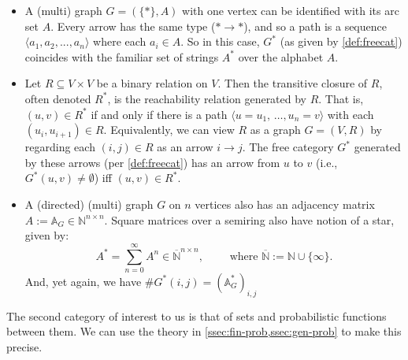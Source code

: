\begin{itemize}
    \item 
A (multi) graph $G = (\{\ast\}, A)$ with one vertex can be identified with its arc set $A$. Every arrow has the same type ($\ast \to \ast$), and so a path is a sequence 
$\langle a_1, a_2, ..., a_n\rangle$
where each $a_i \in A$. 
So in this case, $G^*$ (as given by \cref{def:freecat}) coincides
with the familiar set of strings $A^*$ over the alphabet $A$.

    \item
Let $R \subseteq V \times V$ be a binary relation on $V$.
Then the transitive closure of $R$, often denoted $R^*$,
    is the reachability relation generated by $R$. 
That is, $(u,v) \in R^*$ if and only if there is a path $\langle u{=}u_1,\, \ldots, u_n{=}v\rangle$ with each $(u_i, u_{i+1}) \in R$.
%
Equivalently, we can view $R$ as a graph $G = (V,R)$ by regarding each $(i,j) \in R$ as an arrow $i \to j$. The free category $G^*$ generated by these arrows (per \cref{def:freecat}) has an arrow from $u$ to $v$ (i.e., $G^*(u,v) \ne \emptyset$) iff $(u,v) \in R^*$.

\item 
A (directed) (multi) graph $G$ on $n$ vertices also has an adjacency matrix 
$A := \mathbb A_G \in \mathbb N^{n\times n}$.  Square matrices over a semiring
also have notion of a star, given by:
\[
    A^* = \sum_{n=0}^\infty A^n  \in \overline{\mathbb N}^{n\times n},
    \qquad \text{ where } \overline{\mathbb N} := \mathbb N \cup \{\infty\}.
\]
And, yet again, we have $\#G^*(i,j) = (\mathbb A_G^*)_{i,j}$
\end{itemize}




The second category of interest to us is that of sets and probabilistic functions between them. 
We can use the theory in \cref{ssec:fin-prob,ssec:gen-prob} to make this precise.

